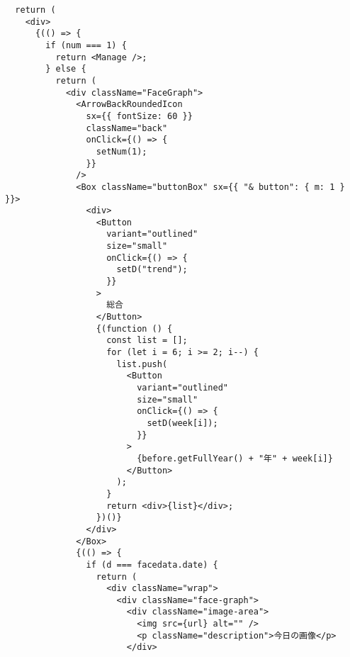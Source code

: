 \begin{verbatim}
  return (
    <div>
      {(() => {
        if (num === 1) {
          return <Manage />;
        } else {
          return (
            <div className="FaceGraph">
              <ArrowBackRoundedIcon
                sx={{ fontSize: 60 }}
                className="back"
                onClick={() => {
                  setNum(1);
                }}
              />
              <Box className="buttonBox" sx={{ "& button": { m: 1 } }}>
                <div>
                  <Button
                    variant="outlined"
                    size="small"
                    onClick={() => {
                      setD("trend");
                    }}
                  >
                    総合
                  </Button>
                  {(function () {
                    const list = [];
                    for (let i = 6; i >= 2; i--) {
                      list.push(
                        <Button
                          variant="outlined"
                          size="small"
                          onClick={() => {
                            setD(week[i]);
                          }}
                        >
                          {before.getFullYear() + "年" + week[i]}
                        </Button>
                      );
                    }
                    return <div>{list}</div>;
                  })()}
                </div>
              </Box>
              {(() => {
                if (d === facedata.date) {
                  return (
                    <div className="wrap">
                      <div className="face-graph">
                        <div className="image-area">
                          <img src={url} alt="" />
                          <p className="description">今日の画像</p>
                        </div>


\end{verbatim}
